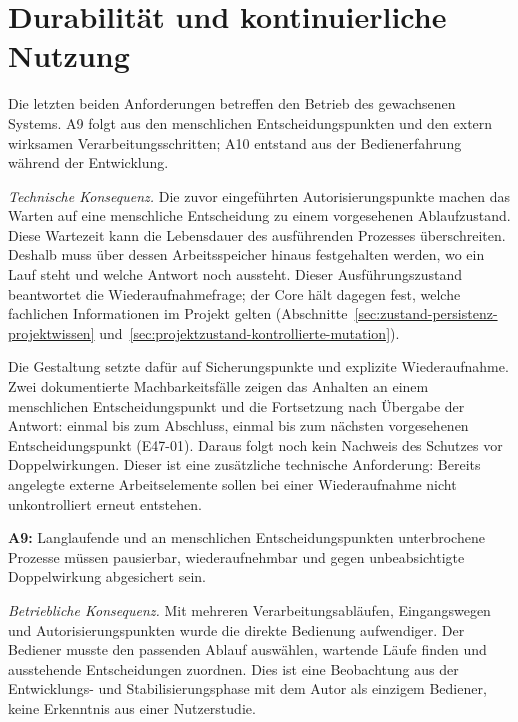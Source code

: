 
\section{Durabilität und kontinuierliche Nutzung}
\label{sec:durabilitaet-kontinuierliche-nutzung}

Die letzten beiden Anforderungen betreffen den Betrieb des gewachsenen
Systems. A9 folgt aus den menschlichen Entscheidungspunkten und den
extern wirksamen Verarbeitungsschritten; A10 entstand aus der
Bedienerfahrung während der Entwicklung.

\emph{Technische Konsequenz.} Die zuvor eingeführten
Autorisierungspunkte machen das Warten auf eine menschliche Entscheidung
zu einem vorgesehenen Ablaufzustand. Diese Wartezeit kann die Lebensdauer
des ausführenden Prozesses überschreiten. Deshalb muss über dessen
Arbeitsspeicher hinaus festgehalten werden, wo ein Lauf steht und welche
Antwort noch aussteht. Dieser Ausführungszustand beantwortet die
Wiederaufnahmefrage; der Core hält dagegen fest, welche fachlichen
Informationen im Projekt gelten
(Abschnitte~\ref{sec:zustand-persistenz-projektwissen}
und~\ref{sec:projektzustand-kontrollierte-mutation}).

Die Gestaltung setzte dafür auf Sicherungspunkte und explizite
Wiederaufnahme. Zwei dokumentierte Machbarkeitsfälle zeigen das Anhalten
an einem menschlichen Entscheidungspunkt und die Fortsetzung nach
Übergabe der Antwort: einmal bis zum Abschluss, einmal bis zum nächsten
vorgesehenen Entscheidungspunkt (E47-01). Daraus folgt noch kein
Nachweis des Schutzes vor Doppelwirkungen. Dieser ist eine zusätzliche
technische Anforderung: Bereits angelegte externe Arbeitselemente sollen
bei einer Wiederaufnahme nicht unkontrolliert erneut entstehen.

\textbf{A9:} Langlaufende und an menschlichen Entscheidungspunkten
unterbrochene Prozesse müssen pausierbar, wiederaufnehmbar und gegen
unbeabsichtigte Doppelwirkung abgesichert sein.

\emph{Betriebliche Konsequenz.} Mit mehreren Verarbeitungsabläufen,
Eingangswegen und Autorisierungspunkten wurde die direkte Bedienung
aufwendiger. Der Bediener musste den passenden Ablauf auswählen, wartende
Läufe finden und ausstehende Entscheidungen zuordnen. Dies ist eine
Beobachtung aus der Entwicklungs- und Stabilisierungsphase mit dem Autor
als einzigem Bediener, keine Erkenntnis aus einer Nutzerstudie.

